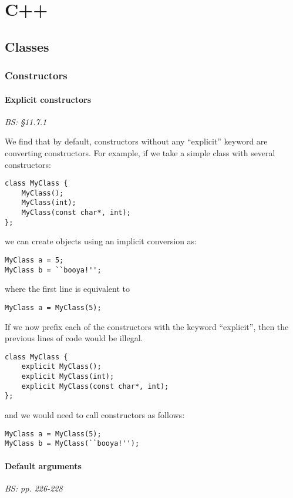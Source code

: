 \chapter{C++}

\section{Classes}

\subsection{Constructors}

\subsubsection{Explicit constructors}

\emph{BS: \S11.7.1}

We find that by default, constructors without any ``explicit'' keyword are converting constructors. For example, if we take a simple class with several constructors:
\begin{verbatim}
class MyClass {
	MyClass();
	MyClass(int);
	MyClass(const char*, int);
};
\end{verbatim}
we can create objects using an implicit conversion as:
\begin{verbatim}
MyClass a = 5;
MyClass b = ``booya!'';
\end{verbatim}
where the first line is equivalent to 
\begin{verbatim}
MyClass a = MyClass(5);
\end{verbatim}

If we now prefix each of the constructors with the keyword ``explicit'', then the previous lines of code would be illegal. 
\begin{verbatim}
class MyClass {
	explicit MyClass();
	explicit MyClass(int);
	explicit MyClass(const char*, int);
};
\end{verbatim}
and we would need to call constructors as follows:
\begin{verbatim}
MyClass a = MyClass(5);
MyClass b = MyClass(``booya!'');
\end{verbatim}


\subsubsection{Default arguments}

\emph{BS: pp. 226-228}

